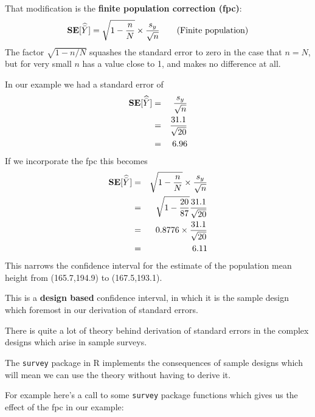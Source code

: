 \documentclass[
]{book}
\newenvironment{Shaded}{\begin{snugshade}}{\end{snugshade}}
\newcommand{\AttributeTok}[1]{\textcolor[rgb]{0.13,0.29,0.53}{#1}}
\newcommand{\DecValTok}[1]{\textcolor[rgb]{0.00,0.00,0.81}{#1}}
\newcommand{\FunctionTok}[1]{\textcolor[rgb]{0.13,0.29,0.53}{\textbf{#1}}}
\newcommand{\NormalTok}[1]{#1}
\newcommand{\OtherTok}[1]{\textcolor[rgb]{0.56,0.35,0.01}{#1}}
\newcommand{\SpecialCharTok}[1]{\textcolor[rgb]{0.81,0.36,0.00}{\textbf{#1}}}
\newcommand{\bfa}[2]{{\rm\bf #1}[#2]}
\begin{document}
That modification is the \textbf{finite population correction (fpc)}:
\[
   \bfa{SE}{\widehat{\bar{Y}}} = \sqrt{1-\frac{n}{N}}\times\frac{s_y}{\sqrt{n}}
   \qquad \text{(Finite population)}
\]
The factor \(\sqrt{1-n/N}\) squashes the standard error to zero in the case that \(n=N\),
but for very small \(n\) has a value close to 1, and makes no difference at all.

In our example we had a standard error of
\begin{eqnarray}
  \bfa{SE}{\widehat{\bar{Y}}} &=& \frac{s_y}{\sqrt{n}}\\
                              &=& \frac{31.1}{\sqrt{20}}\\
                              &=& 6.96
\end{eqnarray}
If we incorporate the fpc this becomes
\begin{eqnarray}
  \bfa{SE}{\widehat{\bar{Y}}} &=& \sqrt{1-\frac{n}{N}}\times\frac{s_y}{\sqrt{n}}\\
                              &=& \sqrt{1-\frac{20}{87}}\frac{31.1}{\sqrt{20}}\\
                              &=& 0.8776 \times \frac{31.1}{\sqrt{20}}\\
                              &=& 6.11
\end{eqnarray}
This narrows the confidence interval for the estimate of the population mean height
from (165.7,194.9)
to (167.5,193.1).

This is a \textbf{design based} confidence interval, in which it is the sample design
which foremost in our derivation of standard errors.

There is quite a lot of theory behind derivation of standard errors in the complex
designs which arise in sample surveys.

The \texttt{survey} package in R implements the consequences of sample designs which will
mean we can use the theory without having to derive it.

For example here's a call to some \texttt{survey} package functions which
gives us the effect of the fpc in our example:

\begin{Shaded}
\end{Shaded}
\end{document}
